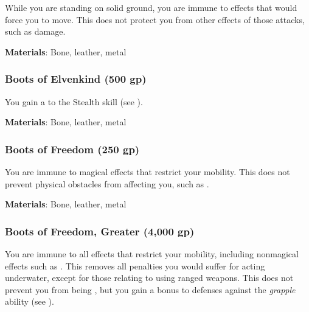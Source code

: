 While you are standing on solid ground, you are immune to effects that would force you to move.
This does not protect you from other effects of those attacks, such as damage.



\vspace{0.25em}
\textbf{Materials}: Bone, leather, metal


\lowercase{\hypertarget{item:Boots of Elvenkind}{}}\label{item:Boots of Elvenkind}
\hypertarget{item:Boots of Elvenkind}{\subsubsection{Boots of Elvenkind\hfill{} (500 gp)}}

You gain a   to the Stealth skill (see ).



\vspace{0.25em}
\textbf{Materials}: Bone, leather, metal


\lowercase{\hypertarget{item:Boots of Freedom}{}}\label{item:Boots of Freedom}
\hypertarget{item:Boots of Freedom}{\subsubsection{Boots of Freedom\hfill{} (250 gp)}}

You are immune to magical effects that restrict your mobility.
This does not prevent physical obstacles from affecting you, such as .



\vspace{0.25em}
\textbf{Materials}: Bone, leather, metal


\lowercase{\hypertarget{item:Boots of Freedom, Greater}{}}\label{item:Boots of Freedom, Greater}
\hypertarget{item:Boots of Freedom, Greater}{\subsubsection{Boots of Freedom, Greater\hfill{} (4,000 gp)}}

You are immune to all effects that restrict your mobility, including nonmagical effects such as .
This removes all penalties you would suffer for acting underwater, except for those relating to using ranged weapons.
This does not prevent you from being \grappled, but you gain a  bonus to defenses against the \textit{grapple} ability (see ).



